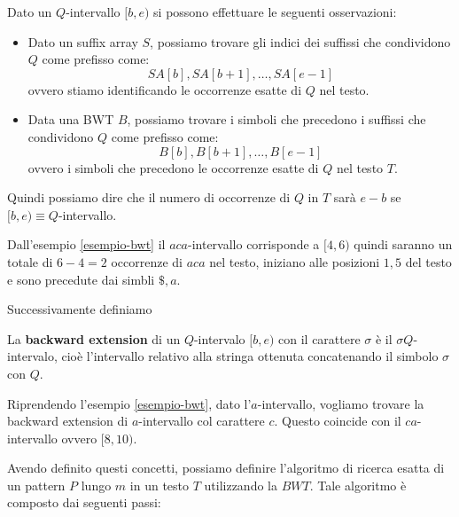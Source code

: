 Dato un $Q$-intervallo $[b, e)$ si possono effettuare le seguenti osservazioni:
\begin{itemize}
    \item Dato un suffix array $S$, possiamo trovare gli indici dei suffissi
          che condividono $Q$ come prefisso come:
          \begin{equation}
              SA[b], SA[b + 1], \dots, SA[e - 1]
          \end{equation}
          ovvero stiamo identificando le occorrenze esatte di $Q$ nel testo.
    \item Data una BWT $B$, possiamo trovare i simboli che precedono i suffissi
          che condividono $Q$ come prefisso come:
          \begin{equation}
              B[b], B[b + 1], \dots, B[e - 1]
          \end{equation}
          ovvero i simboli che precedono le occorrenze esatte di $Q$ nel testo
          $T$.
\end{itemize}
Quindi possiamo dire che il numero di occorrenze di $Q$ in $T$ sarà $e-b$ se
$[b,e) \equiv Q$-intervallo.
\begin{esempio}
    Dall'esempio \ref{esempio-bwt} il $aca$-intervallo corrisponde a $[4,6)$
    quindi saranno un totale di $6 - 4= 2$ occorrenze di $aca$ nel testo,
    iniziano alle posizioni $1,5$ del testo e sono precedute dai simbli $\$,a$.
\end{esempio}
Successivamente definiamo
\begin{definizione}
    La \textbf{backward extension} di un $Q$-intervalo $[b,e)$ con il carattere
    $\sigma$ è il $\sigma Q$-intervalo, cioè l'intervallo relativo alla stringa
    ottenuta concatenando il simbolo $\sigma$ con $Q$.
\end{definizione}
\begin{esempio}
    Riprendendo l'esempio \ref{esempio-bwt}, dato l'$a$-intervallo, vogliamo
    trovare la backward extension di $a$-intervallo col carattere $c$. Questo
    coincide con il  $ca$-intervallo ovvero $[8,10)$.
\end{esempio}
Avendo definito questi concetti, possiamo definire l'algoritmo di ricerca esatta
di un pattern $P$ lungo $m$ in un testo $T$ utilizzando la $BWT$. Tale algoritmo
è composto dai seguenti passi:
